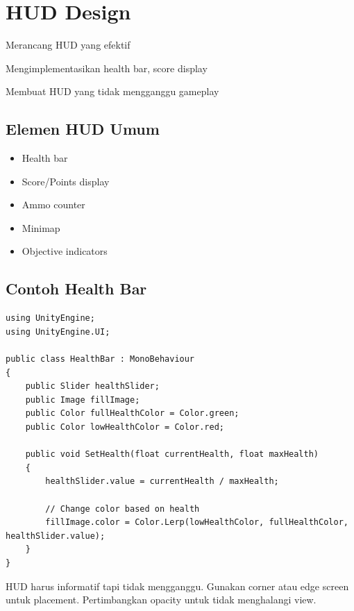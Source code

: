 
\section{HUD Design}

\begin{learningoutcomes}
\item Merancang HUD yang efektif
\item Mengimplementasikan health bar, score display
\item Membuat HUD yang tidak mengganggu gameplay
\end{learningoutcomes}

\subsection{Elemen HUD Umum}

\begin{itemize}
\item Health bar
\item Score/Points display
\item Ammo counter
\item Minimap
\item Objective indicators
\end{itemize}

\subsection{Contoh Health Bar}

\begin{lstlisting}[language={[Sharp]C}]
using UnityEngine;
using UnityEngine.UI;

public class HealthBar : MonoBehaviour
{
    public Slider healthSlider;
    public Image fillImage;
    public Color fullHealthColor = Color.green;
    public Color lowHealthColor = Color.red;
    
    public void SetHealth(float currentHealth, float maxHealth)
    {
        healthSlider.value = currentHealth / maxHealth;
        
        // Change color based on health
        fillImage.color = Color.Lerp(lowHealthColor, fullHealthColor, healthSlider.value);
    }
}
\end{lstlisting}

\begin{catatan}
HUD harus informatif tapi tidak mengganggu. Gunakan corner atau edge screen untuk placement. Pertimbangkan opacity untuk tidak menghalangi view.
\end{catatan}
